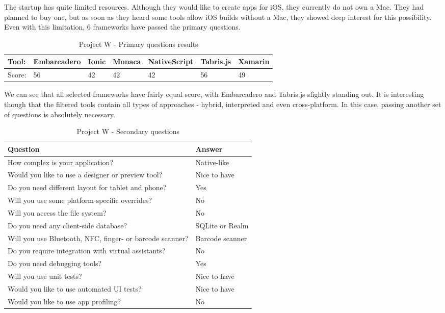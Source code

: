 \documentclass[english,master,public,dept460,male,cpdeclaration,oneside]{diploma}
\begin{document}
The startup has quite limited resources. Although they would like to create apps for iOS, they currently do not own a Mac. They had planned to buy one, but as soon as they heard some tools allow iOS builds without a Mac, they showed deep interest for this possibility. Even with this limitation, 6 frameworks have passed the primary questions.

\begin{table}[!h]
	\centering
	\caption{Project W - Primary questions results}
	\begin{tabular}{p{2cm} | p{1.5cm} | p{1.5cm} | p{1.5cm} | p{1.5cm} | p{1.5cm} | p{1.5cm}}
		\toprule		
		\textbf{Tool:} & \textbf{Embarcadero} & \textbf{Ionic} & \textbf{Monaca} & \textbf{NativeScript} & \textbf{Tabris.js} & \textbf{Xamarin} \\
		\midrule
		Score: & 56 & 42 & 42 & 42 & 56 & 49 \\		
		\midrule
	\end{tabular}
\end{table}

We can see that all selected frameworks have fairly equal score, with Embarcadero and Tabris.js slightly standing out. It is interesting though that the filtered tools contain all types of approaches - hybrid, interpreted and even cross-platform. In this case, passing another set of questions is absolutely necessary.

\begin{table}[!h]
	\centering
	\caption{Project W - Secondary questions}
	\begin{tabular}{p{7.5cm} | p{5cm}}
		\toprule		
		\textbf{Question} &	\textbf{Answer} \\
		\midrule
		How complex is your application? & Native-like \\
		Would you like to use a designer or preview tool? & Nice to have \\
		Do you need different layout for tablet and phone? & Yes \\
		Will you use some platform-specific overrides? & No \\
		Will you access the file system? & No \\
		Do you need any client-side database? & SQLite or Realm \\
		Will you use Bluetooth, NFC, finger- or barcode scanner? & Barcode scanner \\
		Do you require integration with virtual assistants? & No \\
		Do you need debugging tools? & Yes \\
		Will you use unit tests? & Nice to have \\
		Would you like to use automated UI tests? & Nice to have \\
		Would you like to use app profiling? & No \\		
		\midrule
	\end{tabular}
\end{table}
\end{document}
